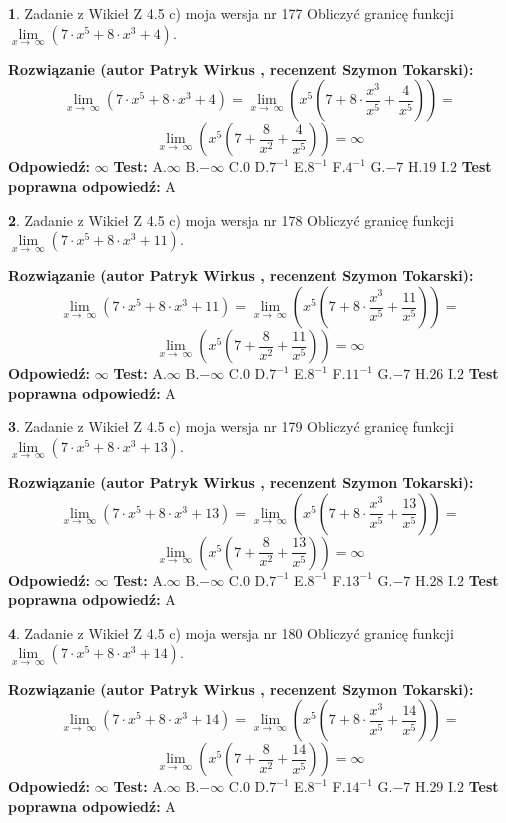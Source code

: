 \documentclass[12pt, a4paper]{article}
\theoremstyle{definition} %
\newtheorem{zad}{}
\newcommand{\zadStart}[1]{\begin{zad}#1\newline}
\newcommand{\zadStop}{\end{zad}}
\newcommand{\rozwStart}[2]{\noindent \textbf{Rozwiązanie (autor #1 , recenzent #2): }\newline}
\newcommand{\rozwStop}{\newline}
\newcommand{\odpStart}{\noindent \textbf{Odpowiedź:}\newline}
\newcommand{\odpStop}{\newline}
\newcommand{\testStart}{\noindent \textbf{Test:}\newline}
\newcommand{\testStop}{\newline}
\newcommand{\kluczStart}{\noindent \textbf{Test poprawna odpowiedź:}\newline}
\newcommand{\kluczStop}{\newline}
\begin{document}
\zadStart{Zadanie z Wikieł Z 4.5 c) moja wersja nr 177}
Obliczyć granicę funkcji  $\lim\limits_{x\to\ \infty}(7 \cdot x^{5}+8 \cdot x^{3}+4)$.
\zadStop
\rozwStart{Patryk Wirkus}{Szymon Tokarski}
$$\lim\limits_{x\to\ \infty}(7 \cdot x^{5}+8 \cdot x^{3}+4) = \lim\limits_{x\to\ \infty}(x^{5}(7 +8 \cdot \frac{x^{3}}{x^{5}}+\frac{4}{x^{5}})) =$$ $$\lim\limits_{x\to\ \infty}(x^{5}(7 +\frac{8}{x^{2}}+\frac{4}{x^{5}})) =\infty$$
\rozwStop
\odpStart
$\infty$
\odpStop
\testStart
A.$\infty$ B.$-\infty$ C.$0$ D.$7^{-1}$ E.$8^{-1}$
F.$4^{-1}$ G.$-7$
H.$19$
I.$2$
\testStop
\kluczStart
A
\kluczStop



\zadStart{Zadanie z Wikieł Z 4.5 c) moja wersja nr 178}
Obliczyć granicę funkcji  $\lim\limits_{x\to\ \infty}(7 \cdot x^{5}+8 \cdot x^{3}+11)$.
\zadStop
\rozwStart{Patryk Wirkus}{Szymon Tokarski}
$$\lim\limits_{x\to\ \infty}(7 \cdot x^{5}+8 \cdot x^{3}+11) = \lim\limits_{x\to\ \infty}(x^{5}(7 +8 \cdot \frac{x^{3}}{x^{5}}+\frac{11}{x^{5}})) =$$ $$\lim\limits_{x\to\ \infty}(x^{5}(7 +\frac{8}{x^{2}}+\frac{11}{x^{5}})) =\infty$$
\rozwStop
\odpStart
$\infty$
\odpStop
\testStart
A.$\infty$ B.$-\infty$ C.$0$ D.$7^{-1}$ E.$8^{-1}$
F.$11^{-1}$ G.$-7$
H.$26$
I.$2$
\testStop
\kluczStart
A
\kluczStop



\zadStart{Zadanie z Wikieł Z 4.5 c) moja wersja nr 179}
Obliczyć granicę funkcji  $\lim\limits_{x\to\ \infty}(7 \cdot x^{5}+8 \cdot x^{3}+13)$.
\zadStop
\rozwStart{Patryk Wirkus}{Szymon Tokarski}
$$\lim\limits_{x\to\ \infty}(7 \cdot x^{5}+8 \cdot x^{3}+13) = \lim\limits_{x\to\ \infty}(x^{5}(7 +8 \cdot \frac{x^{3}}{x^{5}}+\frac{13}{x^{5}})) =$$ $$\lim\limits_{x\to\ \infty}(x^{5}(7 +\frac{8}{x^{2}}+\frac{13}{x^{5}})) =\infty$$
\rozwStop
\odpStart
$\infty$
\odpStop
\testStart
A.$\infty$ B.$-\infty$ C.$0$ D.$7^{-1}$ E.$8^{-1}$
F.$13^{-1}$ G.$-7$
H.$28$
I.$2$
\testStop
\kluczStart
A
\kluczStop



\zadStart{Zadanie z Wikieł Z 4.5 c) moja wersja nr 180}
Obliczyć granicę funkcji  $\lim\limits_{x\to\ \infty}(7 \cdot x^{5}+8 \cdot x^{3}+14)$.
\zadStop
\rozwStart{Patryk Wirkus}{Szymon Tokarski}
$$\lim\limits_{x\to\ \infty}(7 \cdot x^{5}+8 \cdot x^{3}+14) = \lim\limits_{x\to\ \infty}(x^{5}(7 +8 \cdot \frac{x^{3}}{x^{5}}+\frac{14}{x^{5}})) =$$ $$\lim\limits_{x\to\ \infty}(x^{5}(7 +\frac{8}{x^{2}}+\frac{14}{x^{5}})) =\infty$$
\rozwStop
\odpStart
$\infty$
\odpStop
\testStart
A.$\infty$ B.$-\infty$ C.$0$ D.$7^{-1}$ E.$8^{-1}$
F.$14^{-1}$ G.$-7$
H.$29$
I.$2$
\testStop
\kluczStart
A
\kluczStop
\end{document}
